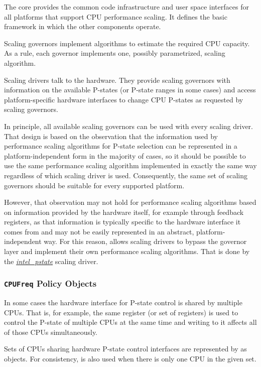 \documentclass[a4paper,8pt,english]{sphinxmanual}
\begin{document}
The  core provides the common code infrastructure and user space
interfaces for all platforms that support CPU performance scaling.  It defines
the basic framework in which the other components operate.

Scaling governors implement algorithms to estimate the required CPU capacity.
As a rule, each governor implements one, possibly parametrized, scaling
algorithm.

Scaling drivers talk to the hardware.  They provide scaling governors with
information on the available P-states (or P-state ranges in some cases) and
access platform-specific hardware interfaces to change CPU P-states as requested
by scaling governors.

In principle, all available scaling governors can be used with every scaling
driver.  That design is based on the observation that the information used by
performance scaling algorithms for P-state selection can be represented in a
platform-independent form in the majority of cases, so it should be possible
to use the same performance scaling algorithm implemented in exactly the same
way regardless of which scaling driver is used.  Consequently, the same set of
scaling governors should be suitable for every supported platform.

However, that observation may not hold for performance scaling algorithms
based on information provided by the hardware itself, for example through
feedback registers, as that information is typically specific to the hardware
interface it comes from and may not be easily represented in an abstract,
platform-independent way.  For this reason,  allows scaling drivers
to bypass the governor layer and implement their own performance scaling
algorithms.  That is done by the {\hyperref[admin\string-guide/pm/intel_pstate::doc]{\emph{\emph{intel\_pstate}}}} scaling driver.


\subsubsection{\texttt{CPUFreq} Policy Objects}
\label{admin-guide/pm/cpufreq:cpufreq-policy-objects}
In some cases the hardware interface for P-state control is shared by multiple
CPUs.  That is, for example, the same register (or set of registers) is used to
control the P-state of multiple CPUs at the same time and writing to it affects
all of those CPUs simultaneously.

Sets of CPUs sharing hardware P-state control interfaces are represented by
 as  objects.  For consistency,
 is also used when there is only one CPU in the given
set.
\end{document}
